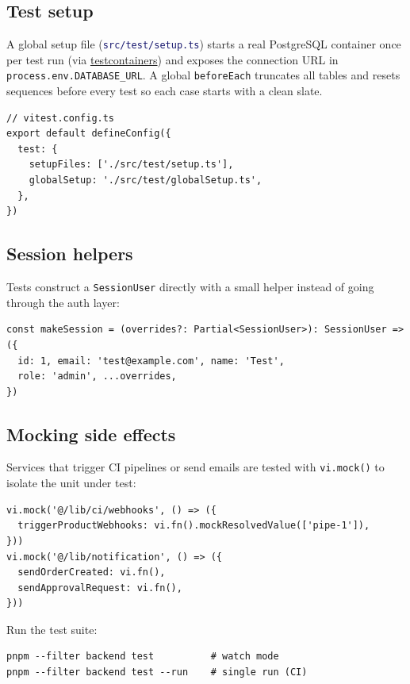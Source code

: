 \documentclass[12pt,a4paper,twoside]{report}
\newcommand{\code}[1]{\texttt{#1}}
\newcommand{\file}[1]{\texttt{\textcolor{MidnightBlue}{#1}}}
\begin{document}
\subsection*{Test setup}

A global setup file (\file{src/test/setup.ts}) starts a real
PostgreSQL container once per test run (via
\href{https://node.testcontainers.org}{testcontainers}) and exposes
the connection URL in \code{process.env.DATABASE\_URL}.  A global
\code{beforeEach} truncates all tables and resets sequences before
every test so each case starts with a clean slate.

\begin{lstlisting}[style=ts]
// vitest.config.ts
export default defineConfig({
  test: {
    setupFiles: ['./src/test/setup.ts'],
    globalSetup: './src/test/globalSetup.ts',
  },
})
\end{lstlisting}

\subsection*{Session helpers}

Tests construct a \code{SessionUser} directly with a small helper
instead of going through the auth layer:

\begin{lstlisting}[style=ts]
const makeSession = (overrides?: Partial<SessionUser>): SessionUser => ({
  id: 1, email: 'test@example.com', name: 'Test',
  role: 'admin', ...overrides,
})
\end{lstlisting}

\subsection*{Mocking side effects}

Services that trigger CI pipelines or send emails are tested with
\code{vi.mock()} to isolate the unit under test:

\begin{lstlisting}[style=ts]
vi.mock('@/lib/ci/webhooks', () => ({
  triggerProductWebhooks: vi.fn().mockResolvedValue(['pipe-1']),
}))
vi.mock('@/lib/notification', () => ({
  sendOrderCreated: vi.fn(),
  sendApprovalRequest: vi.fn(),
}))
\end{lstlisting}

Run the test suite:
\begin{lstlisting}[style=bash]
pnpm --filter backend test          # watch mode
pnpm --filter backend test --run    # single run (CI)
\end{lstlisting}
\end{document}
